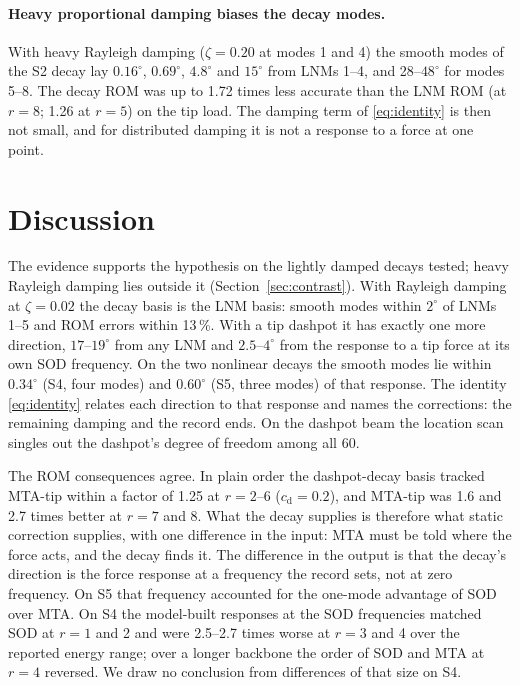 \documentclass[preprint,12pt]{elsarticle}
\begin{document}
\paragraph{Heavy proportional damping biases the decay modes.} With heavy Rayleigh damping ($\zeta=0.20$ at modes 1 and 4) the smooth modes of the S2 decay lay $0.16^\circ$, $0.69^\circ$, $4.8^\circ$ and $15^\circ$ from LNMs 1--4, and 28--$48^\circ$ for modes 5--8. The decay ROM was up to 1.72 times less accurate than the LNM ROM (at $r=8$; 1.26 at $r=5$) on the tip load. The damping term of \eqref{eq:identity} is then not small, and for distributed damping it is not a response to a force at one point.


\section{Discussion}\label{sec:disc}
The evidence supports the hypothesis on the lightly damped decays tested; heavy Rayleigh damping lies outside it (Section~\ref{sec:contrast}). With Rayleigh damping at $\zeta=0.02$ the decay basis is the LNM basis: smooth modes within $2^\circ$ of LNMs 1--5 and ROM errors within 13\,\%. With a tip dashpot it has exactly one more direction, $17$--$19^\circ$ from any LNM and $2.5$--$4^\circ$ from the response to a tip force at its own SOD frequency. On the two nonlinear decays the smooth modes lie within $0.34^\circ$ (S4, four modes) and $0.60^\circ$ (S5, three modes) of that response. The identity \eqref{eq:identity} relates each direction to that response and names the corrections: the remaining damping and the record ends. On the dashpot beam the location scan singles out the dashpot's degree of freedom among all 60.

The ROM consequences agree. In plain order the dashpot-decay basis tracked MTA-tip within a factor of 1.25 at $r=2$--6 ($c_{\mathrm d}=0.2$), and MTA-tip was 1.6 and 2.7 times better at $r=7$ and 8. What the decay supplies is therefore what static correction supplies, with one difference in the input: MTA must be told where the force acts, and the decay finds it. The difference in the output is that the decay's direction is the force response at a frequency the record sets, not at zero frequency. On S5 that frequency accounted for the one-mode advantage of SOD over MTA. On S4 the model-built responses at the SOD frequencies matched SOD at $r=1$ and 2 and were 2.5--2.7 times worse at $r=3$ and 4 over the reported energy range; over a longer backbone the order of SOD and MTA at $r=4$ reversed. We draw no conclusion from differences of that size on S4.
\end{document}
